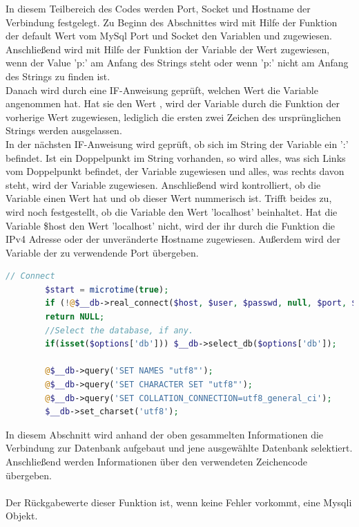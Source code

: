 In diesem Teilbereich des Codes werden Port, Socket und Hostname der Verbindung festgelegt. Zu Beginn des Abschnittes wird mit Hilfe der Funktion  der default Wert vom MySql Port und Socket den Variablen  und  zugewiesen.\\
Anschließend wird mit Hilfe der Funktion  der Variable  der Wert  zugewiesen, wenn der Value 'p:' am Anfang des Strings  steht oder  wenn 'p:' nicht am Anfang des Strings zu finden ist.\\
Danach wird durch eine IF-Anweisung geprüft, welchen Wert die Variable  angenommen hat. Hat sie den Wert , wird der Variable  durch die Funktion  der vorherige Wert zugewiesen, lediglich die ersten zwei Zeichen des ursprünglichen Strings werden ausgelassen. \\
In der nächsten IF-Anweisung wird geprüft, ob sich im String der Variable  ein ':' befindet. Ist ein Doppelpunkt im String vorhanden, so wird alles, was sich Links vom Doppelpunkt befindet, der Variable  zugewiesen und alles, was rechts davon steht, wird der Variable  zugewiesen. Anschließend wird kontrolliert, ob die Variable  einen Wert hat und ob dieser Wert nummerisch ist. Trifft beides zu, wird noch festgestellt, ob die Variable  den Wert 'localhost' beinhaltet. Hat die Variable \code\$host den Wert 'localhost' nicht, wird der ihr durch die Funktion  die IPv4 Adresse oder der unveränderte Hostname zugewiesen. Außerdem wird der Variable  der zu verwendende Port übergeben.

\begin{lstlisting}[language=PHP, caption=mysqli.php/function-db\_connect4, firstnumber=63]
	    // Connect
	    $start = microtime(true);
	    if (!@$__db->real_connect($host, $user, $passwd, null, $port, $socket))
	    return NULL;
	    //Select the database, if any.
	    if(isset($options['db'])) $__db->select_db($options['db']);
	    
	    @$__db->query('SET NAMES "utf8"');
	    @$__db->query('SET CHARACTER SET "utf8"');
	    @$__db->query('SET COLLATION_CONNECTION=utf8_general_ci');
	    $__db->set_charset('utf8');
\end{lstlisting}
In diesem Abschnitt wird anhand der oben gesammelten Informationen die Verbindung zur Datenbank aufgebaut und jene ausgewählte Datenbank selektiert.\\
Anschließend werden Informationen über den verwendeten Zeichencode übergeben.\\
\\
Der Rückgabewerte dieser Funktion ist, wenn keine Fehler vorkommt, eine Mysqli Objekt. 
\newpage

